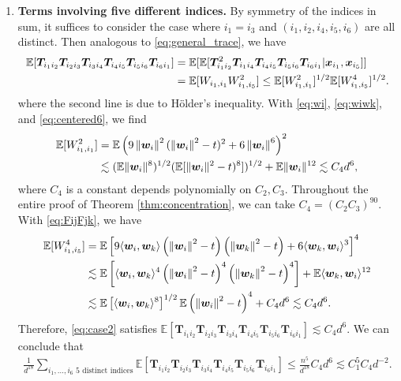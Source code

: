 \documentclass[twoside,11pt]{article}
\newcommand{\norm}[1]{\left\|#1\right\|}
\newcommand{\bw}{\boldsymbol{w}}
\newcommand{\E}{\mathbb{E}}
\def\bw{{\boldsymbol w}}
\def\bx{{\boldsymbol x}}
\def\T{{\mathbb T}}
\def\T{{\mathbb T}}
\renewcommand{\T}{\boldsymbol{T}}
\newcommand{\1}{\mathbf{1}}
\begin{document}
\begin{enumerate}[label=\textbf{Case (\roman*).},leftmargin=0ex, itemindent=12ex]
\item  \textbf{Terms involving five different indices.}  By symmetry of the indices in sum, it suffices to consider the case where $i_1=i_3$ and $(i_1,i_2,i_4,i_5,i_6)$ are all distinct.  Then analogous to \eqref{eq:general_trace}, we have
\begin{align} \E[\T_{i_1i_2}\T_{i_2i_3}\T_{i_3i_4}\T_{i_4i_5}\T_{i_5i_6}\T_{i_6i_1}]
    &= \E[\E[\T_{i_1i_2}^2 \T_{i_1i_4}\T_{i_4i_5}\T_{i_5i_6}\T_{i_6i_1}| \bx_{i_1},\bx_{i_5}]] \notag \\
    &= \E[W_{i_1,i_1}W_{i_1,i_5}^2]\le \E[W_{i_1,i_1}^2]^{1/2}\E[W_{i_1,i_5}^4]^{1/2}. \label{eq:case2}
\end{align}
where the second line is due to Hölder's inequality.  With \eqref{eq:wi}, \eqref{eq:wiwk}, and \eqref{eq:centered6}, we find
\begin{align}
    \E[W_{i_1,i_1}^2]& =\E\left(  9 \norm{\bw_i}^2 (\norm{\bw_i}^2-t )^2 +6 \norm{\bw_i}^6\right)^2  \notag \\
     &\lesssim (\E\|\bw_i\|^8)^{1/2} (\E[\|\bw_i\|^2-t)^8])^{1/2} +\E \|\bw_i\|^{12} \lesssim C_4d^{6}, \label{eq:wiwi2}
\end{align}
where $C_4$ is a constant depends polynomially on $C_2, C_3$. Throughout the entire proof of Theorem \ref{thm:concentration}, we can take $C_4=(C_2C_3)^{90}$. With \eqref{eq:FijFjk}, we have 
\begin{align}
    \E[W_{i_1,i_5}^4]&=\E\left[ 9\langle \bw_i,\bw_k\rangle\left(\norm{\bw_i}^2-t\right)\left(\norm{\bw_k}^2-t\right)+6\langle \bw_k,\bw_i\rangle^3\right]^4 \notag  \\
    &\lesssim \E \left[\langle \bw_i,\bw_k\rangle^4\left(\norm{\bw_i}^2-t\right)^4\left(\norm{\bw_k}^2-t\right)^4 \right]+ \E\langle \bw_k,\bw_i\rangle ^{12} \notag \\
    &\lesssim \E \left[\langle \bw_i,\bw_k\rangle^8\right]^{1/2} \E \left(\norm{\bw_i}^2-t\right)^4+ C_4d^6\lesssim  C_4 d^6. \label{eq:wi4}
\end{align}
Therefore, \eqref{eq:case2} satisfies $\E[\T_{i_1i_2}\T_{i_2i_3}\T_{i_3i_4}\T_{i_4i_5}\T_{i_5i_6}\T_{i_6i_1}]\lesssim C_4 d^6$. 
We can conclude that 
\begin{align}
 \frac{1}{d^{18}} \sum_{ i_1,\dots, i_6 \text{ 5 distinct indices}} \E[\T_{i_1i_2}\T_{i_2i_3}\T_{i_3i_4}\T_{i_4i_5}\T_{i_5i_6}\T_{i_6i_1}] \leq \frac{n^5}{d^{18}}  C_4d^6 \lesssim C_1^5 C_4 d^{-2}.\label{eq:case22}
\end{align}



\end{enumerate}
\end{document}
